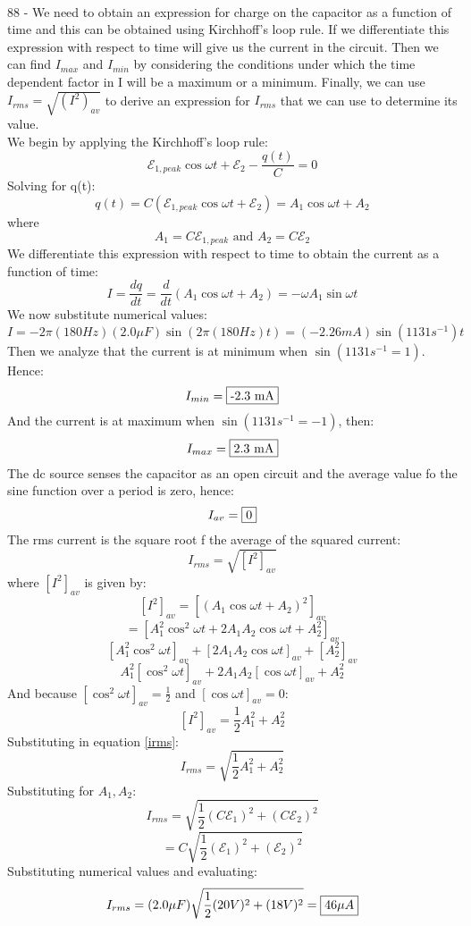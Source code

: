 \documentclass{report}
\begin{document}
\paragraph{}
88 - We need to obtain an expression for charge on the capacitor as a function of time and this can be obtained using Kirchhoff's loop rule. If we differentiate this expression with respect to time will give us the current in the circuit. Then we can find $I_{max}$ and $I_{min}$ by considering the conditions under which the time dependent factor in I will be a maximum or a minimum. Finally, we can use $I_{rms} = \sqrt{(I^2)_{av}}$ to derive an expression for $I_{rms}$ that we can use to determine its value.\\
We begin by applying the Kirchhoff's loop rule:
$$\mathcal{E}_{1,peak} \cos \omega t + \mathcal{E}_2 - \frac{q(t)}{C} = 0$$
Solving for q(t):
$$q(t) = C(\mathcal{E}_{1,peak} \cos \omega t + \mathcal{E}_2) = A_1 \cos \omega t + A_2$$
where
$$A_1 = C\mathcal{E}_{1, peak} \text{ and } A_2 = C\mathcal{E}_2$$
We differentiate this expression with respect to time to obtain the current as a function of time:
$$I = \frac{dq}{dt} = \frac{d}{dt}(A_1 \cos \omega t + A_2) = -\omega A_1 \sin \omega t$$
We now substitute numerical values:
$$I = -2 \pi (180 Hz)(2.0 \mu F) \sin (2 \pi (180 Hz)t) = (-2.26 mA) \sin (1131s^{-1})t$$
Then we analyze that the current is at minimum when $\sin (1131s^{-1} = 1)$. Hence:
$$I_{min} = \fbox{-2.3 mA}$$
And the current is at maximum when $\sin (1131s^{-1} = -1)$, then:
$$I_{max} = \fbox{2.3 mA}$$
The dc source senses the capacitor as an open circuit and the average value fo the sine function over a period is zero, hence:
$$I_{av} = \fbox{0}$$
The rms current is the square root f the average of the squared current:
\begin{equation}\label{irms2}
  I_{rms} = \sqrt{[I^2]_{av}}
\end{equation}
where $[I^2]_{av}$ is given by:
$$[I^2]_{av} = [(A_1 \cos \omega t + A_2)^2]_{av}$$
$$= [A_1^2 \cos^2 \omega t + 2A_1A_2 \cos \omega t + A_2^2]_{av}$$
$$[A_1^2 \cos^2 \omega t]_{av} +[2A_1A_2 \cos \omega t]_{av} + [A_2^2]_{av}$$
$$A_1^2[\cos^2 \omega t]_{av} +2A_1A_2[\cos \omega t]_{av} + A_2^2$$
And because $[\cos^2 \omega t]_{av} = \frac{1}{2}$ and $[\cos \omega t]_{av} = 0$:
$$[I^2]_{av} = \frac{1}{2}A_1^2 + A_2^2$$
Substituting in equation \ref{irms}:
$$I_{rms} = \sqrt{\frac{1}{2}A_1^2 + A_2^2}$$
Substituting for $A_1, A_2$:
$$I_{rms} = \sqrt{\frac{1}{2}(C\mathcal{E}_1)^2 + (C\mathcal{E}_2)^2}$$
$$= C\sqrt{\frac{1}{2}(\mathcal{E}_1)^2 + (\mathcal{E}_2)^2}$$
Substituting numerical values and evaluating:
$$I_{rms} = (2.0 \mu F)\sqrt{\frac{1}{2}(20 V)^2 + (18 V)^2} = \fbox{$46 \mu A$}$$
\end{document}

